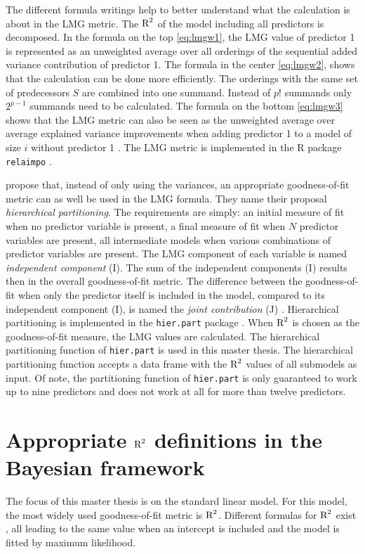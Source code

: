 \documentclass[11pt,a4paper,twoside]{book}\usepackage[]{graphicx}\usepackage[]{color}
\begin{document}
   The different formula writings help to better understand what the calculation is about in the LMG metric. The $\text{R}^2$ of the model including all predictors is decomposed. In the formula on the top \eqref{eq:lmgw1}, the LMG value of predictor 1 is represented as an unweighted average over all orderings of the sequential added variance contribution of predictor 1. The formula in the center \eqref{eq:lmgw2}, shows that the calculation can be  done more efficiently. The orderings with the same set of predecessors $S$ are combined into one summand. Instead of $p!$ summands only $2^{p-1}$ summands need to be calculated. The formula on the bottom \eqref{eq:lmgw3} shows that the LMG metric can also be seen as the unweighted average over average explained variance improvements when adding predictor 1 to a model of size $i$ without predictor 1 \citep{Gromping2015}. The LMG metric is implemented in the R package \texttt{relaimpo} \citep{Gromping2006}.
   
\cite{Chevan1991} propose that, instead of only using the variances, an appropriate goodness-of-fit metric can as well be used in the LMG formula. They name their proposal \textit{hierarchical partitioning}. The requirements are simply: an initial measure of fit when no predictor variable is present, a final measure of fit when $N$ predictor variables are present, all intermediate models when various combinations of predictor variables are present. 
  The LMG component of each variable is named \textit{independent component} (I). The sum of the independent components (I) results then in the overall goodness-of-fit metric. The difference between the goodness-of-fit when only the predictor itself is included in the model, compared to its independent component (I), is named the \textit{joint contribution} (J) \citep{Gromping2015}. Hierarchical partitioning is implemented in the \texttt{hier.part} package \citep{Walsh2015}. When  $\text{R}^2$ is chosen as the goodness-of-fit measure, the LMG values are calculated. The hierarchical partitioning function of \texttt{hier.part} is used in this master thesis. The hierarchical partitioning function accepts a data frame with the $\text{R}^2$ values of all submodels as input. Of note,  the partitioning function of \texttt{hier.part} is only guaranteed to work up to nine predictors and does not work at all for more than twelve predictors.
  
\section{ Appropriate $\text{R}^2$ definitions in the Bayesian framework}
The focus of this master thesis is on the standard linear model. For this model, the most widely used goodness-of-fit metric is $\text{R}^2$.  Different formulas for $\text{R}^2$ exist \cite{Kvalseth1985}, all leading to the same value when an intercept is included and the model is fitted by maximum likelihood. 
\end{document}
